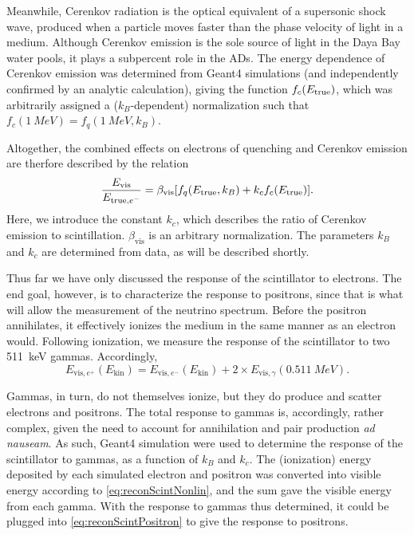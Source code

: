 \documentclass[../thesis.tex]{subfiles}
\begin{document}
Meanwhile, Cerenkov radiation is the optical equivalent of a supersonic shock
wave, produced when a particle moves faster than the phase velocity of light in
a medium. Although Cerenkov emission is the sole source of light in the Daya Bay
water pools, it plays a subpercent role in the ADs. The energy dependence of
Cerenkov emission was determined from Geant4 simulations (and independently
confirmed by an analytic calculation), giving the function $f_c(E_\mathrm{true})$, which
was arbitrarily assigned a ($k_B$-dependent) normalization such that
$f_c(\SI{1}{MeV}) = f_q(\SI{1}{MeV}, k_B)$.

Altogether, the combined effects on electrons of quenching and Cerenkov emission
are therfore described by the relation
\begin{equation}
  \label{eq:reconScintNonlin}
  \frac{E_{\mathrm{vis}}}{E_{\mathrm{true},e^-}} = \beta_{\mathrm{vis}}[f_q(E_\mathrm{true}, k_B) + k_c f_c(E_\mathrm{true})].
\end{equation}
Here, we introduce the constant $k_c$, which describes the ratio of Cerenkov
emission to scintillation. $\beta_{\mathrm{vis}}$ is an arbitrary
normalization. The parameters $k_B$ and $k_c$ are determined from data, as will
be described shortly.

Thus far we have only discussed the response of the scintillator to
electrons. The end goal, however, is to characterize the response to positrons,
since that is what will allow the measurement of the neutrino spectrum. Before
the positron annihilates, it effectively ionizes the medium in the same manner
as an electron would. Following ionization, we measure the response of the
scintillator to two 511~keV gammas. Accordingly,
\begin{equation}
  \label{eq:reconScintPositron}
  E_{\mathrm{vis},e^+}(E_{\mathrm{kin}}) = E_{\mathrm{vis},e^-}(E_{\mathrm{kin}}) + 2 \times E_{\mathrm{vis},\gamma}(\SI{0.511}{MeV}).
\end{equation}

Gammas, in turn, do not themselves ionize, but they do produce and scatter
electrons and positrons. The total response to gammas is, accordingly, rather
complex, given the need to account for annihilation and pair production \emph{ad
  nauseam}. As such, Geant4 simulation were used to determine the response of
the scintillator to gammas, as a function of $k_B$ and $k_c$. The (ionization)
energy deposited by each simulated electron and positron was converted into
visible energy according to \eqref{eq:reconScintNonlin}, and the sum gave the
visible energy from each gamma. With the response to gammas thus determined, it
could be plugged into \eqref{eq:reconScintPositron} to give the response to
positrons.
\end{document}
